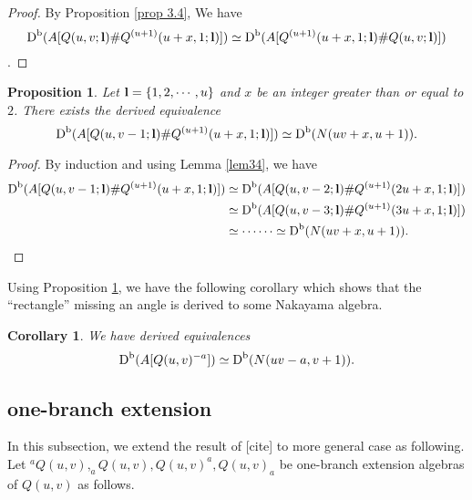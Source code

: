 \documentclass[a4paper, reqno]{amsart}
\newtheorem{cor}[thm]{Corollary}
\newtheorem{prop}[thm]{Proposition}
\theoremstyle{definition}
\theoremstyle{remark}
\numberwithin{equation}{section}
\begin{document}
\begin{proof}
By Proposition \ref{prop 3.4}, We have  
$$\textup{D}^{\textup{b}}(A[Q(u,v;{\bf{l}})\#Q^{(u+1)}(u+x,1;{\bf{l}})])\simeq \textup{D}^{\textup{b}}(A[Q^{(u+1)}(u+x,1;{\bf{l}}) \# Q(u,v;{\bf{l}})]) $$.
\end{proof}

\begin{prop}\label{KeyProp}
Let ${\bf{l}}=\{1,2,\cdots,u\}$ and $x$ be an integer greater than or equal to $2$. There exists the derived equivalence
$$\textup{D}^{\textup{b}}(A[Q(u,v-1;{\bf{l}})\#Q^{(u+1)}(u+x,1;{\bf{l}})])\simeq\textup{D}^{\textup{b}}(N(uv+x,u+1)).$$
\end{prop}

\begin{proof}
    By induction and using Lemma \ref{lem34}, we have
    \begin{align*}
    \textup{D}^{\textup{b}}(A[Q(u,v-1;{\bf{l}})\#Q^{(u+1)}(u+x,1;{\bf{l}})])&\simeq \textup{D}^{\textup{b}}(A[Q(u,v-2;{\bf{l}})\#Q^{(u+1)}(2u+x,1;{\bf{l}})])\\
    &\simeq\textup{D}^{\textup{b}}(A[Q(u,v-3;{\bf{l}})\#Q^{(u+1)}(3u+x,1;{\bf{l}})])\\
    &\simeq \cdots\cdots\simeq\textup{D}^{\textup{b}}(N(uv+x,u+1)).
\end{align*}
\end{proof}

Using Proposition \ref{KeyProp}, we have the following corollary which shows that the ``rectangle'' missing an angle is derived to some Nakayama algebra. 

\begin{cor}
We have derived equivalences 
    $$
    {\textup{D}^{\textup{b}}( A[Q(u,v)^{-a}])} \simeq
    {\textup{D}^{\textup{b}}( N(uv-a,v+1))}.
    $$
\end{cor}

\subsection{one-branch extension}
In this subsection, we extend the result of [cite] to more general case as following. Let $^{a}Q(u,v),_{a}Q(u,v),Q(u,v)^{a},Q(u,v)_{a}$ be one-branch extension algebras of $Q(u,v)$ as follows.
\end{document}
